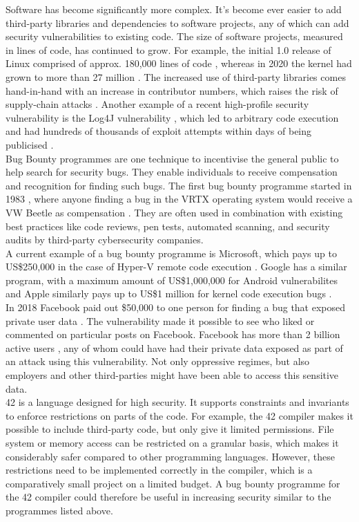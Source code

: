 Software has become significantly more complex. It's become ever easier to add third-party libraries and dependencies to software projects, any of which can add security vulnerabilities to existing code. The size of software projects, measured in lines of code, has continued to grow. For example, the initial 1.0 release of Linux comprised of approx. 180,000 lines of code \cite{mccandless-2020, perry-2012}, whereas in 2020 the kernel had grown to more than 27 million \cite{larabel-2020}. The increased use of third-party libraries comes hand-in-hand with an increase in contributor numbers, which raises the risk of supply-chain attacks \cite{sharma-2021}. Another example of a recent high-profile security vulnerability is the Log4J vulnerability \cite{apache-2021}, which led to arbitrary code execution and had hundreds of thousands of exploit attempts within days of being publicised \cite{raveendran-2021}.
\\[12pt]
Bug Bounty programmes are one technique to incentivise the general public to help search for security bugs. They enable individuals to receive compensation and recognition for finding such bugs. The first bug bounty programme started in 1983 \cite{hackerone-2017}, where anyone finding a bug in the VRTX operating system would receive a VW Beetle as compensation \cite{hunter-ready-inc-1983}. They are often used in combination with existing best practices like code reviews, pen tests, automated scanning, and security audits by third-party cybersecurity companies.
\\[12pt]
A current example of a bug bounty programme is Microsoft, which pays up to US\$250,000 in the case of Hyper-V remote code execution \cite{microsoft-2022}. Google has a similar program, with a maximum amount of US\$1,000,000 for Android vulnerabilites \cite{google-2022} and Apple similarly pays up to US\$1 million for kernel code execution bugs \cite{apple-inc-2022}.
\\[12pt]
In 2018 Facebook paid out \$50,000 to one person for finding a bug that exposed private user data \cite{newman-2018}. The vulnerability made it possible to see who liked or commented on particular posts on Facebook. Facebook has more than 2 billion active users \cite{datareportal-2022}, any of whom could have had their private data exposed as part of an attack using this vulnerability. Not only oppressive regimes, but also employers and other third-parties might have been able to access this sensitive data.
\\[12pt]
42 is a language designed for high security. It supports constraints and invariants to enforce restrictions on parts of the code. For example, the 42 compiler makes it possible to include third-party code, but only give it limited permissions. File system or memory access can be restricted on a granular basis, which makes it considerably safer compared to other programming languages. However, these restrictions need to be implemented correctly in the compiler, which is a comparatively small project on a limited budget. A bug bounty programme for the 42 compiler could therefore be useful in increasing security similar to the programmes listed above.




